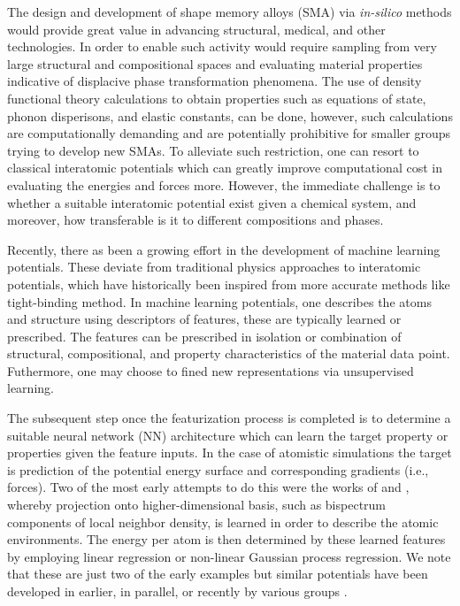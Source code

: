 \documentclass[preprint,colorlinks=true,linkcolor=black,citecolor=black]{elsarticle}
\begin{document}
The design and development of shape memory alloys (SMA) via
\textit{in-silico} methods would provide great value in advancing
structural, medical, and other technologies. In order to enable such
activity would require sampling from very large structural and
compositional spaces and evaluating material properties indicative of
displacive phase transformation phenomena. The use of density
functional theory calculations to obtain properties such as equations
of state, phonon disperisons, and elastic constants, can be done,
however, such calculations are computationally demanding and are
potentially prohibitive for smaller groups trying to develop new
SMAs. To alleviate such restriction, one can resort to classical
interatomic potentials which can greatly improve computational cost in
evaluating the energies and forces more. However, the immediate
challenge is to whether a suitable interatomic potential exist given a
chemical system, and moreover, how transferable is it to different
compositions and phases. \par

Recently, there as been a growing effort in the development of machine
learning potentials. These deviate from traditional physics approaches
to interatomic potentials, which have historically been inspired from
more accurate methods like tight-binding method. In machine learning
potentials, one describes the atoms and structure using descriptors of
features, these are typically learned or prescribed. The features can
be prescribed in isolation or combination of structural,
compositional, and property characteristics of the material data
point. Futhermore, one may choose to fined new representations via
unsupervised learning. \par

The subsequent step once the featurization process is completed is to
determine a suitable neural network (NN) architecture which can learn
the target property or properties given the feature inputs. In the
case of atomistic simulations the target is prediction of the
potential energy surface and corresponding gradients (i.e.,
forces). Two of the most early attempts to do this were the works of
\citet{Bartok2010} and \citet{Thompson2015}, whereby projection onto
higher-dimensional basis, such as bispectrum components of local
neighbor density, is learned in order to describe the atomic
environments. The energy per atom is then determined by these learned
features by employing linear regression or non-linear Gaussian process
regression. We note that these are just two of the early examples but
similar potentials have been developed in earlier, in parallel, or
recently by various groups
\cite{Behler2007,Wang2018,Deringer2019,Lee2019}. \par
\end{document}
